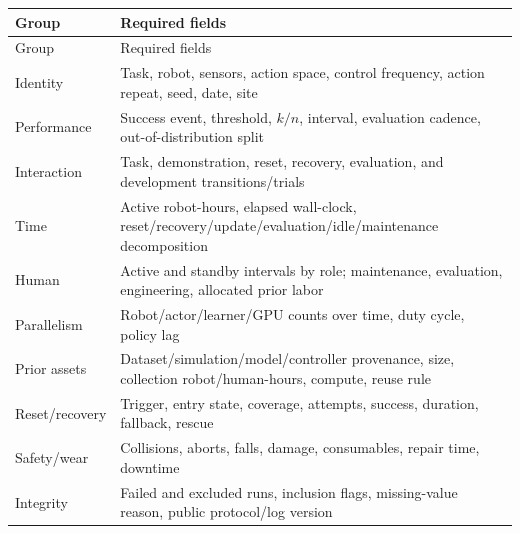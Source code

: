 \documentclass[11pt]{article}
\begin{document}
\begin{longtable}{p{}p{}}
\toprule
Group & Required fields \\
\midrule
\endfirsthead
\toprule
Group & Required fields \\
\midrule
\endhead
Identity & Task, robot, sensors, action space, control frequency, action repeat, seed, date, site \\
Performance & Success event, threshold, $k/n$, interval, evaluation cadence, out-of-distribution split \\
Interaction & Task, demonstration, reset, recovery, evaluation, and development transitions/trials \\
Time & Active robot-hours, elapsed wall-clock, reset/recovery/update/evaluation/idle/maintenance decomposition \\
Human & Active and standby intervals by role; maintenance, evaluation, engineering, allocated prior labor \\
Parallelism & Robot/actor/learner/GPU counts over time, duty cycle, policy lag \\
Prior assets & Dataset/simulation/model/controller provenance, size, collection robot/human-hours, compute, reuse rule \\
Reset/recovery & Trigger, entry state, coverage, attempts, success, duration, fallback, rescue \\
Safety/wear & Collisions, aborts, falls, damage, consumables, repair time, downtime \\
Integrity & Failed and excluded runs, inclusion flags, missing-value reason, public protocol/log version \\
\bottomrule
\end{longtable}



\end{document}
